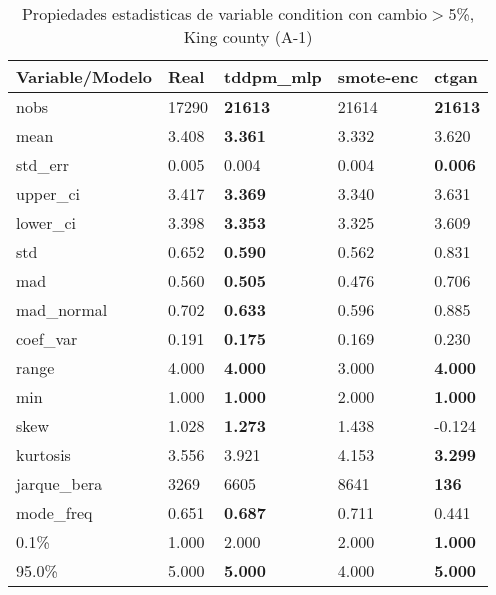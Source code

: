 \begin{table}[H]
\centering
\fontsize{8}{14}\selectfont
\caption{Propiedades estadisticas de variable condition con cambio\ensuremath{>}5\%, King county (A-1)}
\label{table-stats-king county-a-1-condition-short}
\begin{tabular}{|l|m{10em}|m{10em}|m{10em}|m{10em}|}
\hline
 \rowcolor[gray]{0.8}
Variable/Modelo & Real & tddpm\_mlp & smote-enc & ctgan \\
\hline nobs & 17290 & \bfseries 21613 & \cellcolor[rgb]{0.9, 0.54, 0.52} 21614 & \bfseries 21613 \\
\hline mean & 3.408 & \bfseries 3.361 & 3.332 & \cellcolor[rgb]{0.9, 0.54, 0.52} 3.620 \\
\hline std\_err & 0.005 & 0.004 & \cellcolor[rgb]{0.9, 0.54, 0.52} 0.004 & \bfseries 0.006 \\
\hline upper\_ci & 3.417 & \bfseries 3.369 & 3.340 & \cellcolor[rgb]{0.9, 0.54, 0.52} 3.631 \\
\hline lower\_ci & 3.398 & \bfseries 3.353 & 3.325 & \cellcolor[rgb]{0.9, 0.54, 0.52} 3.609 \\
\hline std & 0.652 & \bfseries 0.590 & 0.562 & \cellcolor[rgb]{0.9, 0.54, 0.52} 0.831 \\
\hline mad & 0.560 & \bfseries 0.505 & 0.476 & \cellcolor[rgb]{0.9, 0.54, 0.52} 0.706 \\
\hline mad\_normal & 0.702 & \bfseries 0.633 & 0.596 & \cellcolor[rgb]{0.9, 0.54, 0.52} 0.885 \\
\hline coef\_var & 0.191 & \bfseries 0.175 & 0.169 & \cellcolor[rgb]{0.9, 0.54, 0.52} 0.230 \\
\hline range & 4.000 & \bfseries 4.000 & \cellcolor[rgb]{0.9, 0.54, 0.52} 3.000 & \bfseries 4.000 \\
\hline min & 1.000 & \bfseries 1.000 & \cellcolor[rgb]{0.9, 0.54, 0.52} 2.000 & \bfseries 1.000 \\
\hline skew & 1.028 & \bfseries 1.273 & 1.438 & \cellcolor[rgb]{0.9, 0.54, 0.52} -0.124 \\
\hline kurtosis & 3.556 & 3.921 & \cellcolor[rgb]{0.9, 0.54, 0.52} 4.153 & \bfseries 3.299 \\
\hline jarque\_bera & 3269 & 6605 & \cellcolor[rgb]{0.9, 0.54, 0.52} 8641 & \bfseries 136 \\
\hline mode\_freq & 0.651 & \bfseries 0.687 & 0.711 & \cellcolor[rgb]{0.9, 0.54, 0.52} 0.441 \\
\hline 0.1\% & 1.000 & \cellcolor[rgb]{0.9, 0.54, 0.52} 2.000 & \cellcolor[rgb]{0.9, 0.54, 0.52} 2.000 & \bfseries 1.000 \\
\hline 95.0\% & 5.000 & \bfseries 5.000 & \cellcolor[rgb]{0.9, 0.54, 0.52} 4.000 & \bfseries 5.000 \\
\hline
\end{tabular}
\end{table}
